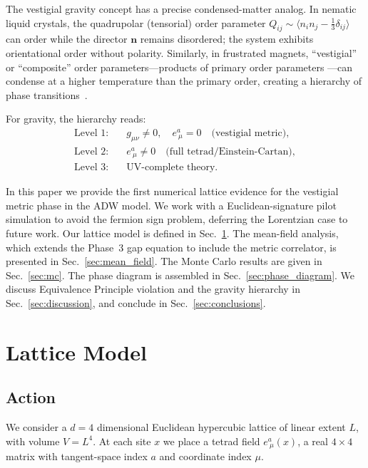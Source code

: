 \documentclass[aps,prd,twocolumn,superscriptaddress,nofootinbib]{revtex4-2}
\newcommand{\vev}[1]{\langle #1 \rangle}
\begin{document}
The vestigial gravity concept has a precise condensed-matter analog.
In nematic liquid crystals, the quadrupolar (tensorial) order parameter
$Q_{ij} \sim \vev{n_i n_j - \frac{1}{3}\delta_{ij}}$ can order while
the director $\bm{n}$ remains disordered; the system exhibits orientational
order without polarity. Similarly, in frustrated magnets, ``vestigial''
or ``composite'' order parameters---products of primary order parameters
---can condense at a higher temperature than the primary order, creating
a hierarchy of phase transitions~\cite{Fernandes2019}.

For gravity, the hierarchy reads:
\begin{align}
\text{Level 1:} &\quad g_{\mu\nu} \neq 0, \quad e^a_{\ \mu} = 0
  \quad\text{(vestigial metric)}, \nonumber \\
\text{Level 2:} &\quad e^a_{\ \mu} \neq 0
  \quad\text{(full tetrad/Einstein-Cartan)}, \nonumber \\
\text{Level 3:} &\quad\text{UV-complete theory}.
\end{align}

In this paper we provide the first numerical lattice evidence for the
vestigial metric phase in the ADW model. We work with a Euclidean-signature
pilot simulation to avoid the fermion sign problem, deferring the Lorentzian
case to future work. Our lattice model is defined in
Sec.~\ref{sec:lattice}. The mean-field analysis, which extends the Phase~3
gap equation to include the metric correlator, is presented in
Sec.~\ref{sec:mean_field}. The Monte Carlo results are given in
Sec.~\ref{sec:mc}. The phase diagram is assembled in
Sec.~\ref{sec:phase_diagram}. We discuss Equivalence Principle violation
and the gravity hierarchy in Sec.~\ref{sec:discussion}, and conclude in
Sec.~\ref{sec:conclusions}.

\section{Lattice Model}
\label{sec:lattice}

\subsection{Action}

We consider a $d=4$ dimensional Euclidean hypercubic lattice of linear
extent $L$, with volume $V = L^4$. At each site $x$ we place a tetrad
field $e^a_{\ \mu}(x)$, a real $4\times 4$ matrix with tangent-space
index $a$ and coordinate index $\mu$.
\end{document}
